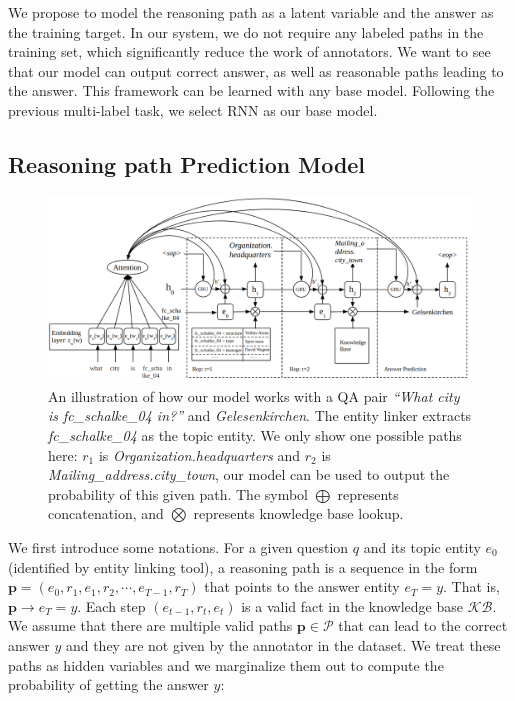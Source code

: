 We propose to model the reasoning path as a latent variable and the answer as the training target. In our system, we do not require any labeled paths in the training set, which significantly reduce the work of annotators. We want to see that our model can output correct answer, as well as reasonable paths leading to the answer. This framework can be learned with any base model. Following the previous multi-label task, we select RNN as our base model.

\subsection{Reasoning path Prediction Model}

\begin{figure}[t]\centering
\includegraphics[width=1.0\columnwidth]{Images/model.png}
\caption{An illustration of how our model works with a QA pair \textit{``What city is fc\_schalke\_04 in?''} and \textit{Gelesenkirchen}. The entity linker extracts \textit{fc\_schalke\_04} as the topic entity. We only show one possible paths here: $r_1$ is \textit{Organization.headquarters} and $r_2$ is \textit{Mailing\_address.city\_town}, our model can be used to output the probability of this given path. The symbol $\bigoplus$ represents concatenation, and $\bigotimes$ represents knowledge base lookup. }
\label{fig:model}
\end{figure}


We first introduce some notations. For a given question $q$ and its topic entity $e_0$ (identified by entity linking tool), a reasoning path is a sequence in the form $\mathbf{p} = (e_0, r_{1},e_{1},r_{2}, \cdots,e_{T-1}, r_{T})$ that points to the answer entity $e_T=y$. That is, $\mathbf{p}\rightarrow e_T=y$. Each step $(e_{t-1},r_t,e_t)$ is a valid fact in the knowledge base $\mathcal{KB}$. We assume that there are multiple valid paths $\mathbf{p}\in \mathcal{P}$ that can lead to the correct answer $y$ and they are not given by the annotator in the dataset. We treat these paths as hidden variables and we marginalize them out to compute the probability of getting the answer $y$:

